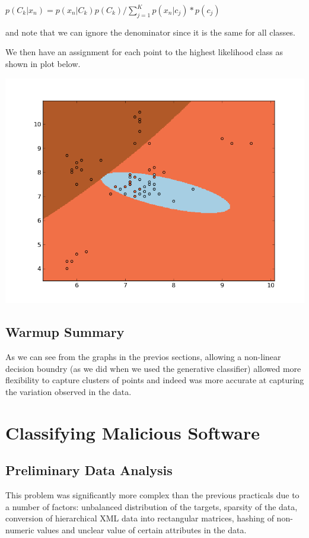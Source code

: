 \documentclass[11pt, oneside]{article}   	%
\begin{document}
$p(C_k |x_n) = p(x_n |C_k)  p(C_k) / \sum\limits_{j=1}^K p(x_n | c_j) * p(c_j)$

and note that we can ignore the denominator since it is the same for all classes.

We then have an assignment for each point to the highest likelihood class as shown in plot below.


\includegraphics[scale=.6]{generative_classifier}


\subsection*{Warmup Summary}

As we can see from the graphs in the previos sections, allowing a non-linear decision boundry (as we did when we used the generative classifier) allowed more flexibility to capture clusters of points and indeed was more accurate at capturing the variation observed in the data.

\section*{Classifying Malicious Software}

\subsection*{Preliminary Data Analysis}

This problem was significantly more complex than the previous practicals due to a number of factors: unbalanced distribution of the targets, sparsity of the data, conversion of hierarchical XML data into rectangular matrices, hashing of non-numeric values and unclear value of certain attributes in the data. 
\end{document}
